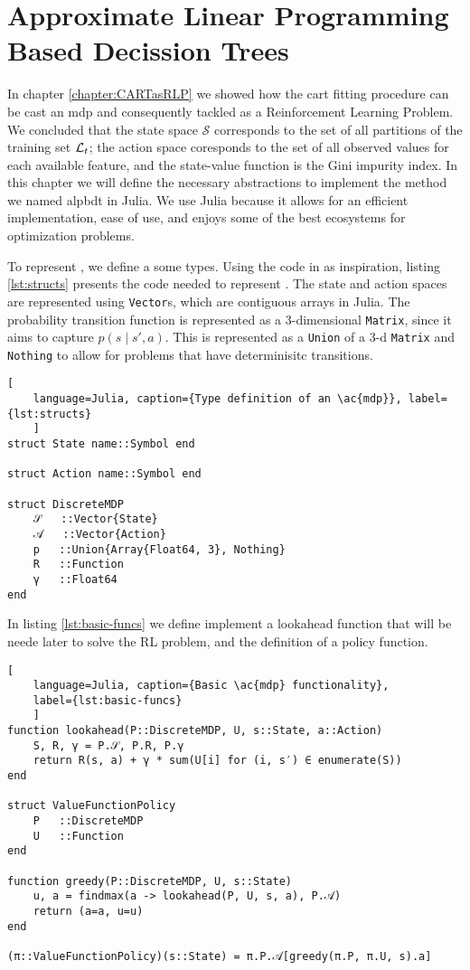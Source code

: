 \chapter{Approximate Linear Programming Based Decission Trees}
\label{chapter:ALPBDT}

In chapter \ref{chapter:CARTasRLP} we showed how the \ac{cart} fitting procedure
can be cast an \ac{mdp} and consequently tackled as a Reinforcement Learning
Problem. We concluded that the state space $\mathcal{S}$ corresponds to the set
of all partitions of the training set $\mathcal{L}_t$; the action space coresponds to the
set of all observed values for each available feature, and the state-value
function is the Gini impurity index. In this chapter we will define the
necessary abstractions to implement the method we named \acf{alpbdt} in Julia.
We use Julia because it allows for an efficient implementation, ease of use, and
enjoys some of the best ecosystems for optimization problems.

To represent , we define a some types. Using the code in
\cite{kochenderfer2022} as inspiration, listing \ref{lst:structs} presents the
code needed to represent . The state and action spaces are represented
using \lstinline{Vector}s, which are contiguous arrays in Julia. The probability
transition function is represented as a 3-dimensional \lstinline{Matrix}, since
it aims to capture $p(s \mid s', a)$. This is represented as a \lstinline{Union}
of a 3-d \lstinline{Matrix} and \lstinline{Nothing} to allow for problems that
have determinisitc transitions.

\begin{lstlisting}[
    language=Julia, caption={Type definition of an \ac{mdp}}, label={lst:structs}
    ]
struct State name::Symbol end

struct Action name::Symbol end

struct DiscreteMDP
    𝒮   ::Vector{State}
    𝒜   ::Vector{Action}
    p   ::Union{Array{Float64, 3}, Nothing}
    R   ::Function
    γ   ::Float64
end
\end{lstlisting}

In listing \ref{lst:basic-funcs} we define implement a lookahead function that
will be neede later to solve the RL problem, and the definition of a policy
function.

\begin{lstlisting}[
    language=Julia, caption={Basic \ac{mdp} functionality},
    label={lst:basic-funcs}
    ]
function lookahead(P::DiscreteMDP, U, s::State, a::Action)
    S, R, γ = P.𝒮, P.R, P.γ
    return R(s, a) + γ * sum(U[i] for (i, s′) ∈ enumerate(S))
end

struct ValueFunctionPolicy
    P   ::DiscreteMDP
    U   ::Function
end

function greedy(P::DiscreteMDP, U, s::State)
    u, a = findmax(a -> lookahead(P, U, s, a), P.𝒜)
    return (a=a, u=u)
end

(π::ValueFunctionPolicy)(s::State) = π.P.𝒜[greedy(π.P, π.U, s).a]
\end{lstlisting}

